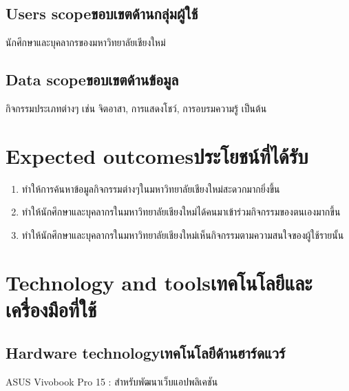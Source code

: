 \subsection{\ifenglish Users scope\else ขอบเขตด้านกลุ่มผู้ใช้\fi}
นักศึกษาและบุคลากรของมหาวิทยาลัยเชียงใหม่
\subsection{\ifenglish Data scope\else ขอบเขตด้านข้อมูล\fi}
กิจกรรมประเภทต่างๆ เช่น จิตอาสา, การแสดงโชว์, การอบรมความรู้ เป็นต้น 
\section{\ifenglish Expected outcomes\else ประโยชน์ที่ได้รับ\fi}
\begin{enumerate}
    \item ทำให้การค้นหาข้อมูลกิจกรรมต่างๆในมหาวิทยาลัยเชียงใหม่สะดวกมากยิ่งขึ้น
    \item ทำให้นักศึกษาและบุคลากรในมหาวิทยาลัยเชียงใหม่ได้คนมาเข้าร่วมกิจกรรมของตนเองมากขึ้น
    \item ทำให้นักศึกษาและบุคลากรในมหาวิทยาลัยเชียงใหม่เห็นกิจกรรมตามความสนใจของผู้ใช้รายนั้น
\end{enumerate}
\section{\ifenglish Technology and tools\else เทคโนโลยีและเครื่องมือที่ใช้\fi}

\subsection{\ifenglish Hardware technology\else เทคโนโลยีด้านฮาร์ดแวร์\fi}
ASUS Vivobook Pro 15 : สำหรับพัฒนาเว็บแอปพลิเคชัน
